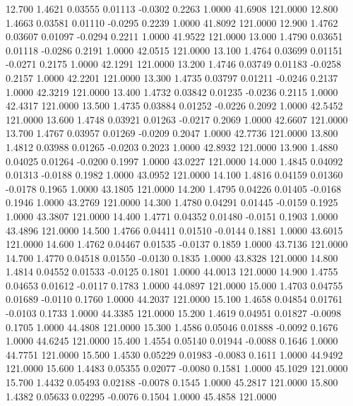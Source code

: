   12.700   1.4621   0.03555   0.01113  -0.0302   0.2263   1.0000  41.6908 121.0000
  12.800   1.4663   0.03581   0.01110  -0.0295   0.2239   1.0000  41.8092 121.0000
  12.900   1.4762   0.03607   0.01097  -0.0294   0.2211   1.0000  41.9522 121.0000
  13.000   1.4790   0.03651   0.01118  -0.0286   0.2191   1.0000  42.0515 121.0000
  13.100   1.4764   0.03699   0.01151  -0.0271   0.2175   1.0000  42.1291 121.0000
  13.200   1.4746   0.03749   0.01183  -0.0258   0.2157   1.0000  42.2201 121.0000
  13.300   1.4735   0.03797   0.01211  -0.0246   0.2137   1.0000  42.3219 121.0000
  13.400   1.4732   0.03842   0.01235  -0.0236   0.2115   1.0000  42.4317 121.0000
  13.500   1.4735   0.03884   0.01252  -0.0226   0.2092   1.0000  42.5452 121.0000
  13.600   1.4748   0.03921   0.01263  -0.0217   0.2069   1.0000  42.6607 121.0000
  13.700   1.4767   0.03957   0.01269  -0.0209   0.2047   1.0000  42.7736 121.0000
  13.800   1.4812   0.03988   0.01265  -0.0203   0.2023   1.0000  42.8932 121.0000
  13.900   1.4880   0.04025   0.01264  -0.0200   0.1997   1.0000  43.0227 121.0000
  14.000   1.4845   0.04092   0.01313  -0.0188   0.1982   1.0000  43.0952 121.0000
  14.100   1.4816   0.04159   0.01360  -0.0178   0.1965   1.0000  43.1805 121.0000
  14.200   1.4795   0.04226   0.01405  -0.0168   0.1946   1.0000  43.2769 121.0000
  14.300   1.4780   0.04291   0.01445  -0.0159   0.1925   1.0000  43.3807 121.0000
  14.400   1.4771   0.04352   0.01480  -0.0151   0.1903   1.0000  43.4896 121.0000
  14.500   1.4766   0.04411   0.01510  -0.0144   0.1881   1.0000  43.6015 121.0000
  14.600   1.4762   0.04467   0.01535  -0.0137   0.1859   1.0000  43.7136 121.0000
  14.700   1.4770   0.04518   0.01550  -0.0130   0.1835   1.0000  43.8328 121.0000
  14.800   1.4814   0.04552   0.01533  -0.0125   0.1801   1.0000  44.0013 121.0000
  14.900   1.4755   0.04653   0.01612  -0.0117   0.1783   1.0000  44.0897 121.0000
  15.000   1.4703   0.04755   0.01689  -0.0110   0.1760   1.0000  44.2037 121.0000
  15.100   1.4658   0.04854   0.01761  -0.0103   0.1733   1.0000  44.3385 121.0000
  15.200   1.4619   0.04951   0.01827  -0.0098   0.1705   1.0000  44.4808 121.0000
  15.300   1.4586   0.05046   0.01888  -0.0092   0.1676   1.0000  44.6245 121.0000
  15.400   1.4554   0.05140   0.01944  -0.0088   0.1646   1.0000  44.7751 121.0000
  15.500   1.4530   0.05229   0.01983  -0.0083   0.1611   1.0000  44.9492 121.0000
  15.600   1.4483   0.05355   0.02077  -0.0080   0.1581   1.0000  45.1029 121.0000
  15.700   1.4432   0.05493   0.02188  -0.0078   0.1545   1.0000  45.2817 121.0000
  15.800   1.4382   0.05633   0.02295  -0.0076   0.1504   1.0000  45.4858 121.0000
